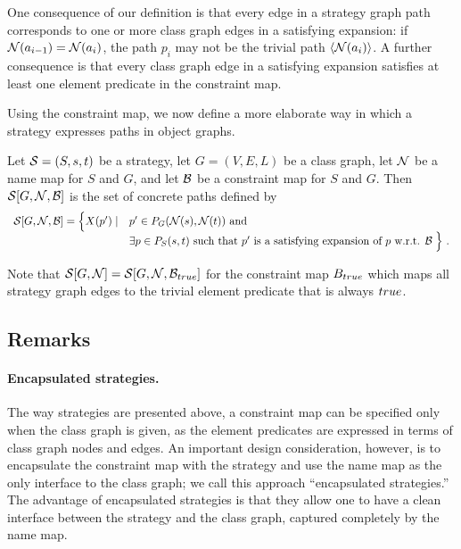 One consequence of our definition is that every edge in a strategy
graph path corresponds to one or more class graph edges in a
satisfying expansion: if ${\cal N}(a_{i-1})={\cal N}(a_i)$, the path $p_i$ may
not be the trivial path $\left\langle {\cal N}(a_i) \right\rangle$.  A further consequence is
that every class graph edge in a satisfying expansion satisfies at
least one element predicate in the constraint map.

Using the constraint map, we now define a more elaborate way in which
a strategy expresses paths in object graphs.

\begin{definition}
\label{def-strategy-paths}
Let ${\cal S}=(S,s,t)$ be a strategy, let $G=(V,E,L)$ be a class graph, let
${\cal N}$ be a name map for $S$ and $G$, and let ${\cal B}$ be a constraint map
for $S$ and $G$.  Then ${\cal S}[G,{\cal N},{\cal B}]$ is the set of concrete paths
defined by
$$
\begin{array}{ll}
{\cal S}[G,{\cal N},{\cal B}]=\Bigl\{X(p')\mid&
p'\in P_G({\cal N}(s),{\cal N}(t))\mbox{ and }\\
&\exists p\in P_S(s,t)\mbox{ such that $p'$ is a satisfying expansion of $p$
w.r.t. ${\cal B}$}\;
\Bigr\}~.
\end{array}
$$
\end{definition}
%
Note that ${\cal S}[G,{\cal N}]={\cal S}[G,{\cal N},{\cal B}_{\sc true}]$ for the constraint map
$B_{\sc true}$ which maps all strategy graph edges to the trivial element
predicate that is always ${\sc true}$.

\subsection{Remarks}
\label{ssec-strategies-ext}
\paragraph{Encapsulated strategies.}
The way strategies are presented above, a constraint map can be
specified only when the class graph is given, as the element
predicates are expressed in terms of class graph nodes and edges. An
important design consideration, however, is to encapsulate the
constraint map with the strategy and use the name map as the only
interface to the class graph; we call this approach ``encapsulated
strategies.'' The advantage of encapsulated strategies is that they
allow one to have a clean interface between the strategy and the class
graph, captured completely by the name map.

